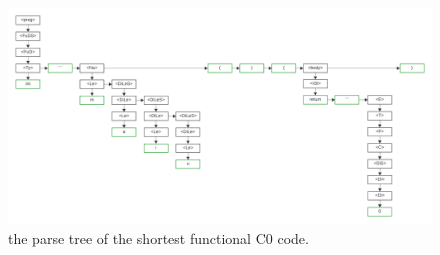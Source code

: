 \begin{figure}[h!]
    \includegraphics[width=\linewidth]{parseTree.png}
    \caption{the parse tree of the shortest functional C0 code.}
    \label{figure 6}
\end{figure}
